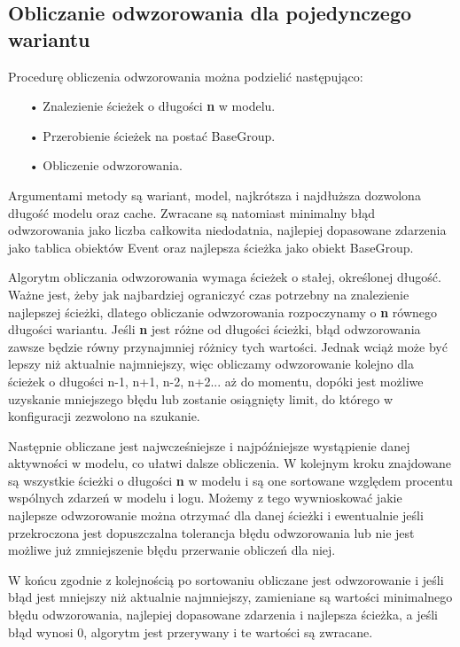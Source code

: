 \subsection{Obliczanie odwzorowania dla pojedynczego wariantu}
Procedurę obliczenia odwzorowania można podzielić następująco:
\begin{itemize}
  \item[•] Znalezienie ścieżek o długości \textbf{n} w modelu.
  \item[•] Przerobienie ścieżek na postać BaseGroup.
  \item[•] Obliczenie odwzorowania.
\end{itemize}

Argumentami metody są wariant, model, najkrótsza i najdłuższa dozwolona długość modelu oraz cache. Zwracane są natomiast minimalny błąd odwzorowania jako liczba całkowita niedodatnia, najlepiej dopasowane zdarzenia jako tablica obiektów Event oraz najlepsza ścieżka jako obiekt BaseGroup.

Algorytm obliczania odwzorowania wymaga ścieżek o stałej, określonej długość. Ważne jest, żeby jak najbardziej ograniczyć czas potrzebny na znalezienie najlepszej ścieżki, dlatego obliczanie odwzorowania rozpoczynamy o \textbf{n} równego długości wariantu. Jeśli \textbf{n} jest różne od długości ścieżki, błąd odwzorowania zawsze będzie równy przynajmniej różnicy tych wartości. Jednak wciąż może być lepszy niż aktualnie najmniejszy, więc obliczamy odwzorowanie kolejno dla ścieżek o długości n-1, n+1, n-2, n+2... aż do momentu, dopóki jest możliwe uzyskanie mniejszego błędu lub zostanie osiągnięty limit, do którego w konfiguracji zezwolono na szukanie. 

Następnie obliczane jest najwcześniejsze i najpóźniejsze wystąpienie danej aktywności w modelu, co ułatwi dalsze obliczenia. W kolejnym kroku znajdowane są wszystkie ścieżki o długości \textbf{n} w modelu i są one sortowane względem procentu wspólnych zdarzeń w modelu i logu. Możemy z tego wywnioskować jakie najlepsze odwzorowanie można otrzymać dla danej ścieżki i ewentualnie jeśli przekroczona jest dopuszczalna tolerancja błędu odwzorowania lub nie jest możliwe już zmniejszenie błędu przerwanie obliczeń dla niej.    

W końcu zgodnie z kolejnością po sortowaniu obliczane jest odwzorowanie i jeśli błąd jest mniejszy niż aktualnie najmniejszy, zamieniane są wartości minimalnego błędu odwzorowania, najlepiej dopasowane zdarzenia i najlepsza ścieżka, a jeśli błąd wynosi 0, algorytm jest przerywany i te wartości są zwracane.

